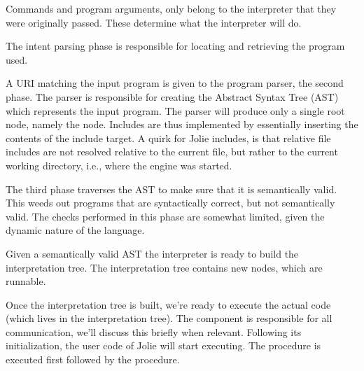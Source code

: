 Commands and program arguments, only belong to the interpreter that they were
originally passed. These determine what the interpreter will do.

The intent parsing phase is responsible for locating and retrieving the program
used.

A URI matching the input program is given to the program parser, the second
phase. The parser is responsible for creating the Abstract Syntax Tree (AST)
    which represents the input program. The parser will produce only a single
    root node, namely the  node. Includes are thus implemented by
    essentially inserting the contents of the include target. A quirk for Jolie
    includes, is that relative file includes are not resolved relative to the
    current file, but rather to the current working directory, i.e., where the
    engine was started.

The third phase traverses the AST to make sure that it is semantically valid.
This weeds out programs that are syntactically correct, but not semantically
valid. The checks performed in this phase are somewhat limited, given the
dynamic nature of the language.

Given a semantically valid AST the interpreter is ready to build the
interpretation tree. The interpretation tree contains new nodes, which are
runnable.

Once the interpretation tree is built, we're ready to execute the actual code
(which lives in the interpretation tree). The  component is
responsible for all communication, we'll discuss this briefly when relevant.
Following its initialization, the user code of Jolie will start executing. The
 procedure is executed first followed by the 
procedure.
